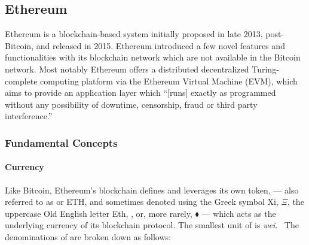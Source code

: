 \subsection{Ethereum}

Ethereum is a blockchain-based system initially proposed in late 2013,
post-Bitcoin, and released in 2015.\cite{ethereum-white} Ethereum introduced a
few novel features and functionalities with its blockchain network which are not
available in the Bitcoin network. Most notably Ethereum offers a distributed
decentralized Turing-complete computing platform via the Ethereum Virtual
Machine (EVM), which aims to provide an application layer which ``[runs] exactly
as programmed without any possibility of downtime, censorship, fraud or third
party interference.''\cite{ethereum.org,ethereum-yellow}

\subsubsection{Fundamental Concepts}

\paragraph{Currency}
Like Bitcoin, Ethereum's blockchain defines and leverages its own token,
 --- also referred to as  or ETH, and sometimes denoted
using the Greek symbol Xi, $\Xi$, the uppercase Old English letter Eth, \DH, or,
more rarely, $\blacklozenge$ --- which acts as the underlying currency of its
blockchain protocol. The smallest unit of  is
\emph{wei}.~\cite{mastering-ethereum,ethereum-yellow} The
denominations of  are broken down as follows:


%
%
%

